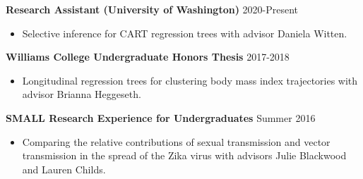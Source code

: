 \documentclass[margin, 10pt]{res} %
\begin{document}
\begin{resume}
{\textbf{Research Assistant (University of Washington)} \hfill 2020-Present
\begin{itemize}
\item Selective inference for CART regression trees with advisor Daniela Witten.
\end{itemize} 

{\textbf{Williams College Undergraduate Honors Thesis}} \hfill 2017-2018 
\begin{itemize}
\item Longitudinal regression trees for clustering body mass index trajectories with advisor Brianna Heggeseth. 
\end{itemize} 

{\textbf{SMALL Research Experience for Undergraduates}} \hfill Summer 2016 
\begin{itemize}
\item Comparing the relative contributions of sexual transmission and vector transmission in the spread of the Zika virus with advisors Julie Blackwood and Lauren Childs. 
\end{itemize} 


}
\end{resume}
\end{document}
